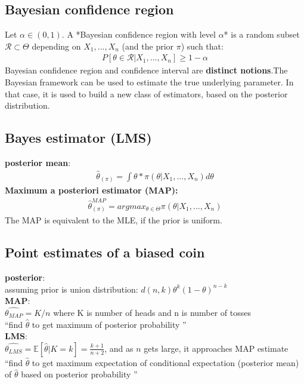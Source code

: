 \subsection{Bayesian confidence region}
Let $\alpha \in (0, 1)$. A *Bayesian confidence region with level $\alpha$* is a random subset $\mathcal{R} \subset \Theta$ depending on $X_1,...,X_n$ (and the prior $\pi$) such that:
\begin{align*}
P[\theta \in \mathcal{R} | X_1,...,X_n] \geq 1 - \alpha
\end{align*}
Bayesian confidence region and confidence interval are \textbf{distinct notions}.The Bayesian framework can be used to estimate the true underlying parameter. In that case, it is used to build a new class of estimators, based on the posterior distribution.
\subsection{Bayes estimator (LMS)}
\textbf{posterior mean}:
\begin{align*}
\hat{\theta}_{(\pi)} = \int\theta*\pi(\theta | X_1,...,X_n)d\theta
\end{align*}
\textbf{Maximum a posteriori estimator (MAP):}
\begin{align*}
\hat{\theta}^{MAP}_{(\pi)} = argmax_{\theta\in\Theta}\pi(\theta | X_1,...,X_n)
\end{align*}
The MAP is equivalent to the MLE, if the prior is uniform.
\subsection{Point estimates of a biased coin}
\textbf{posterior}: \\
assuming prior is union distribution: $d(n,k)\theta^{k}(1-\theta )^{n-k}$ \\
\textbf{MAP}: \\
$\hat{\theta_{MAP}} = K/n$ where K is number of heads and n is number of tosses \\
\textquotedblleft find $\hat{\theta}$ to get maximum of posterior probability \textquotedblright \\
\textbf{LMS}: \\
$\hat{\theta_{LMS}} = \mathbb{E}[\hat{\theta}|K=k]=\frac{k+1}{n+2}$, and as $n$ gets large, it approaches MAP estimate \\
\textquotedblleft find $\hat{\theta}$ to get maximum expectation of conditional expectation (posterior mean) of $\hat{\theta}$ based on posterior probability \textquotedblright
